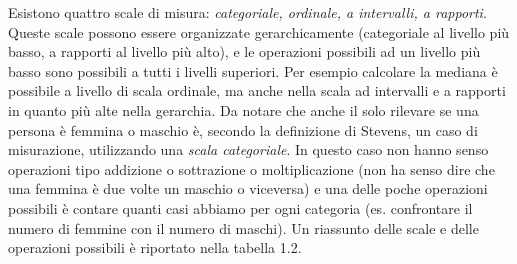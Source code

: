 \documentclass[
  italian,
  letterpaper,
  paper=A4,
  headinclude=on,
  footinclude=on,
  12pt]{scrbook}
\begin{document}
Esistono quattro scale di misura: \emph{categoriale, ordinale, a
intervalli, a rapporti}. Queste scale possono essere organizzate
gerarchicamente (categoriale al livello più basso, a rapporti al livello
più alto), e le operazioni possibili ad un livello più basso sono
possibili a tutti i livelli superiori. Per esempio calcolare la mediana
è possibile a livello di scala ordinale, ma anche nella scala ad
intervalli e a rapporti in quanto più alte nella gerarchia. Da notare
che anche il solo rilevare se una persona è femmina o maschio è, secondo
la definizione di Stevens, un caso di misurazione, utilizzando una
\emph{scala categoriale}. In questo caso non hanno senso operazioni tipo
addizione o sottrazione o moltiplicazione (non ha senso dire che una
femmina è due volte un maschio o viceversa) e una delle poche operazioni
possibili è contare quanti casi abbiamo per ogni categoria (es.
confrontare il numero di femmine con il numero di maschi). Un riassunto
delle scale e delle operazioni possibili è riportato nella tabella 1.2.
\end{document}
